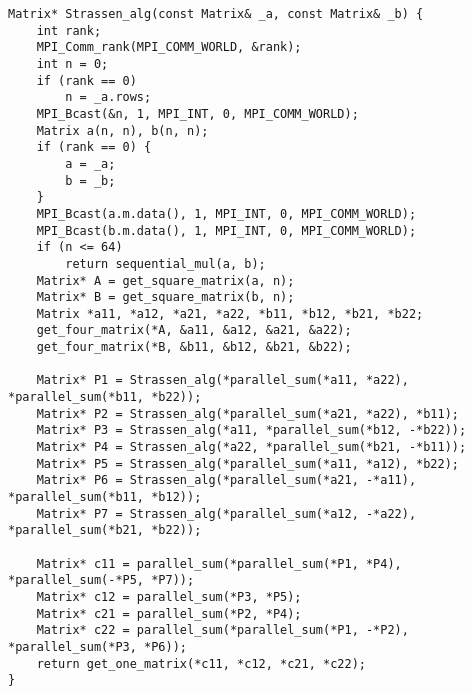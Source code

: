 \documentclass{report}
\begin{document}
\begin{lstlisting}
Matrix* Strassen_alg(const Matrix& _a, const Matrix& _b) {
    int rank;
    MPI_Comm_rank(MPI_COMM_WORLD, &rank);
    int n = 0;
    if (rank == 0)
        n = _a.rows;
    MPI_Bcast(&n, 1, MPI_INT, 0, MPI_COMM_WORLD);
    Matrix a(n, n), b(n, n);
    if (rank == 0) {
        a = _a;
        b = _b;
    }
    MPI_Bcast(a.m.data(), 1, MPI_INT, 0, MPI_COMM_WORLD);
    MPI_Bcast(b.m.data(), 1, MPI_INT, 0, MPI_COMM_WORLD);
    if (n <= 64)
        return sequential_mul(a, b);
    Matrix* A = get_square_matrix(a, n);
    Matrix* B = get_square_matrix(b, n);
    Matrix *a11, *a12, *a21, *a22, *b11, *b12, *b21, *b22;
    get_four_matrix(*A, &a11, &a12, &a21, &a22);
    get_four_matrix(*B, &b11, &b12, &b21, &b22);

    Matrix* P1 = Strassen_alg(*parallel_sum(*a11, *a22), *parallel_sum(*b11, *b22));
    Matrix* P2 = Strassen_alg(*parallel_sum(*a21, *a22), *b11);
    Matrix* P3 = Strassen_alg(*a11, *parallel_sum(*b12, -*b22));
    Matrix* P4 = Strassen_alg(*a22, *parallel_sum(*b21, -*b11));
    Matrix* P5 = Strassen_alg(*parallel_sum(*a11, *a12), *b22);
    Matrix* P6 = Strassen_alg(*parallel_sum(*a21, -*a11), *parallel_sum(*b11, *b12));
    Matrix* P7 = Strassen_alg(*parallel_sum(*a12, -*a22), *parallel_sum(*b21, *b22));

    Matrix* c11 = parallel_sum(*parallel_sum(*P1, *P4), *parallel_sum(-*P5, *P7));
    Matrix* c12 = parallel_sum(*P3, *P5);
    Matrix* c21 = parallel_sum(*P2, *P4);
    Matrix* c22 = parallel_sum(*parallel_sum(*P1, -*P2), *parallel_sum(*P3, *P6));
    return get_one_matrix(*c11, *c12, *c21, *c22);
}
\end{lstlisting}
\end{document}
